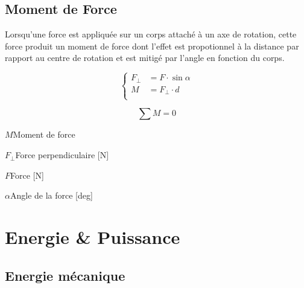 \documentclass[12pt,a4paper]{article} %
\begin{document}
\newpage

\subsection{Moment de Force}
Lorsqu'une force est appliquée sur un corps attaché à un axe de rotation, cette force produit un moment de force dont l'effet est propotionnel à la distance par rapport au centre de rotation et est mitigé par l'angle en fonction du corps.
\par\hspace{1em}
\begin{mdframed}[leftmargin=2em, rightmargin=2em]
	\begin{twocols}[0.5][0.5]
	\[
		\left\{
			\begin{aligned}
			F_\perp &= F \cdot \sin \alpha \\
			M &= F_\perp \cdot d \\
			\end{aligned}
		\right.
	\]

	\[\sum M = 0\]
	\nextcol
	\begin{vardef}
		\item{$M$}{Moment de force}
		\item{$F_\perp$}{Force perpendiculaire [N]}
		\item{$F$}{Force [N]}
		\item{$\alpha$}{Angle de la force [deg]}
	\end{vardef}
	\end{twocols}
\end{mdframed}

\newpage

\section{Energie \& Puissance}

\subsection{Energie mécanique}
\end{document}
